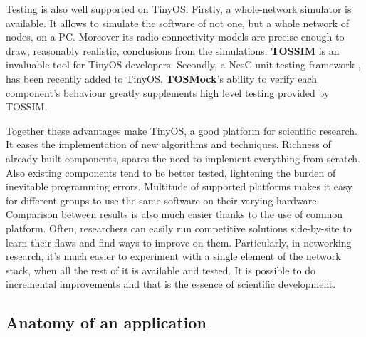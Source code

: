 Testing is also well supported on TinyOS. Firstly, a whole-network
simulator \cite{TOSSIM} is available. It allows to simulate the
software of not one, but a whole network of nodes, on a PC. Moreover
its radio connectivity models are precise enough to draw, reasonably
realistic, conclusions from the simulations. {\bf TOSSIM} is an
invaluable tool for TinyOS developers. Secondly, a NesC unit-testing
framework \cite{TOSMock}, has been recently added to TinyOS. {\bf
TOSMock}'s ability to verify each component's behaviour greatly
supplements high level testing provided by TOSSIM.

Together these advantages make TinyOS, a good platform for scientific
research. It eases the implementation of new algorithms and
techniques.  Richness of already built components, spares the need to
implement everything from scratch.  Also existing components tend to
be better tested, lightening the burden of inevitable programming
errors.  Multitude of supported platforms makes it easy for different
groups to use the same software on their varying hardware.  Comparison
between results is also much easier thanks to the use of common
platform.  Often, researchers can easily run competitive solutions
side-by-site to learn their flaws and find ways to improve on them.
Particularly, in networking research, it's much easier to experiment
with a single element of the network stack, when all the rest of it is
available and tested. It is possible to do incremental improvements
and that is the essence of scientific development.

\subsection{Anatomy of an application}

